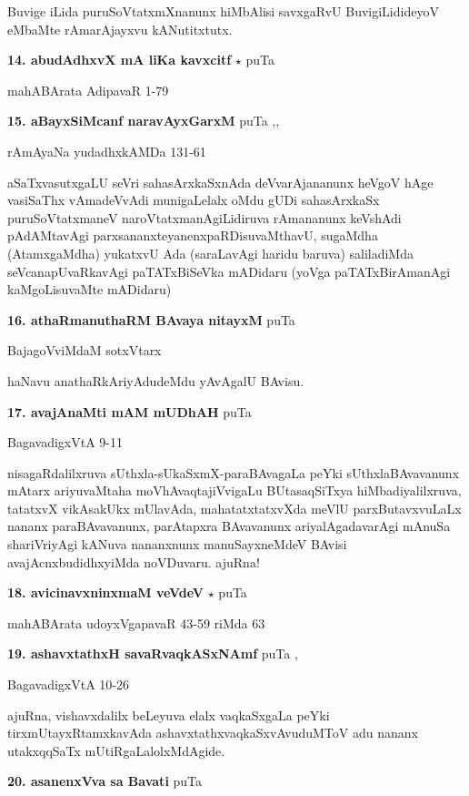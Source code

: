 Buvige iLida puruSoVtatxmXnanunx hiMbAlisi savxgaRvU BuvigiLidideyoV eMbaMte rAmarAjayxvu kANutitxtutx.

\medskip
\noindent\textbf{14. abudAdhxvX mA liKa kavxcitf } $\star$ \hfill puTa \pageref{119a}

\hfill mahABArata AdipavaR 1-79

\medskip
\noindent\textbf{15. aBayxSiMcanf naravAyxGarxM} \hfill puTa \pageref{150},\pageref{208},\pageref{248a}

\hfill rAmAyaNa yudadhxkAMDa 131-61

aSaTxvasutxgaLU seVri sahasArxkaSxnAda deVvarAjananunx heVgoV hAge vasiSaThx vAmadeVvAdi munigaLelalx oMdu gUDi sahasArxkaSx puruSoVtatxmaneV naroVtatxmanAgiLidiruva rAmananunx keVshAdi pAdAMtavAgi parxsananxteyanenxpaRDisuvaMthavU, sugaMdha (AtamxgaMdha) yukatxvU Ada (saraLavAgi haridu baruva) saliladiMda seVcanapUvaRkavAgi paTATxBiSeVka mADidaru (yoVga paTATxBirAmanAgi kaMgoLisuvaMte mADidaru)

\medskip
\noindent\textbf{16. athaRmanuthaRM BAvaya nitayxM} \hfill puTa \pageref{55}

\hfill BajagoVviMdaM sotxVtarx

haNavu anathaRkAriyAdudeMdu yAvAgalU BAvisu.

\medskip
\noindent\textbf{17. avajAnaMti mAM mUDhAH} \hfill puTa \pageref{139}

\hfill BagavadigxVtA 9-11

nisagaRdalilxruva sUthxla-sUkaSxmX-paraBAvagaLa peYki sUthxlaBAvavanunx mAtarx ariyuvaMtaha moVhAvaqtajiVvigaLu BUtasaqSiTxya hiMbadiyalilxruva, tatatxvX vikAsakUkx mUlavAda, mahatatxtatxvXda meVlU parxButavxvuLaLx nananx paraBAvavanunx, parAtapxra BAvavanunx ariyalAgadavarAgi mAnuSa shariVriyAgi kANuva nananxnunx  manuSayxneMdeV BAvisi avajAcnxbudidhxyiMda noVDuvaru. ajuRna!

\medskip
\noindent\textbf{18. avicinavxninxmaM veVdeV}  $\star$ \hfill puTa \pageref{34}

\hfill mahABArata udoyxVgapavaR 43-59 riMda 63

\medskip
\noindent\textbf{19. ashavxtathxH savaRvaqkASxNAmf} \hfill puTa \pageref{93d},\pageref{98}

\hfill BagavadigxVtA 10-26

ajuRna, vishavxdalilx beLeyuva elalx vaqkaSxgaLa peYki tirxmUtayxRtamxkavAda ashavxtathxvaqkaSxvAvuduMToV adu nananx utakxqqSaTx mUtiRgaLalolxMdAgide.

\medskip
\noindent\textbf{20. asanenxVva sa Bavati} \hfill puTa \pageref{24a}

